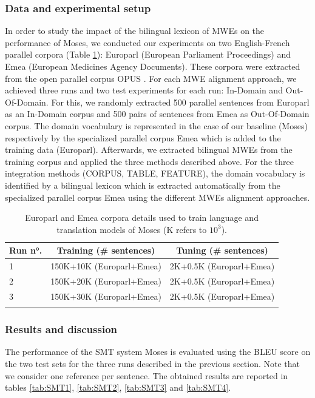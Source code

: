 \documentclass[output=paper,modfonts,nonflat]{langsci/langscibook}
\begin{document}
\subsubsection{Data and experimental setup}
In order to study the impact of the bilingual lexicon of MWEs on the performance of Moses, we conducted our experiments on two English-French parallel corpora (Table \ref{tab:data}): Europarl (European Parliament Proceedings) and Emea (European Medicines Agency Documents). These corpora were extracted from the open parallel corpus OPUS \citep{tiedemann2012parallel}. For each MWE alignment approach, we achieved three runs and two test experiments for each run: In-Domain and Out-Of-Domain. For this, we randomly extracted 500 parallel sentences from Europarl as an In-Domain corpus and 500 pairs of sentences from Emea as Out-Of-Domain corpus. The domain vocabulary is represented in the case of our baseline (Moses) respectively by the specialized parallel corpus Emea which is added to the training data (Europarl). Afterwards, we extracted bilingual MWEs from the training corpus and applied the three methods described above. For the three integration methods (CORPUS, TABLE, FEATURE), the domain vocabulary is identified by a bilingual lexicon which is extracted automatically from the specialized parallel corpus Emea using the different MWEs alignment approaches.

\begin{table}
\caption{Europarl and Emea corpora details used to train language and translation models of Moses (K refers to $10^3$).}
\label{tab:data}
\scriptsize
\centering
 \begin{tabular}{lcc} 
  \lsptoprule
  Run n°. & Training (\# sentences) & Tuning (\# sentences) \\
  \midrule
1 & 150K+10K (Europarl+Emea) & 2K+0.5K (Europarl+Emea)\\
2 & 150K+20K (Europarl+Emea) & 2K+0.5K (Europarl+Emea)\\
3 & 150K+30K (Europarl+Emea) & 2K+0.5K (Europarl+Emea)\\
  \lspbottomrule
 \end{tabular}
\end{table}


\subsubsection{Results and discussion}
The performance of the SMT system Moses is evaluated using the BLEU score \citep{papineni2002bleu} on the two test sets for the three runs described in the previous section. 
Note that we consider one reference per sentence. The obtained results are reported in tables \ref{tab:SMT1}, \ref{tab:SMT2}, \ref{tab:SMT3} and \ref{tab:SMT4}.
\end{document}
